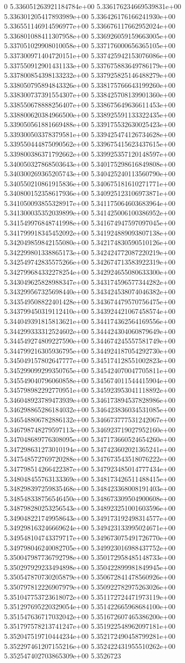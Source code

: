 0	5.336051263921184784e+00	5.336176234669539831e+00	5.336301205417893989e+00	5.336426176166241930e+00	5.336551146914596977e+00	5.336676117662952024e+00	5.336801088411307958e+00	5.336926059159663005e+00	5.337051029908010058e+00	5.337176000656365105e+00	5.337300971404720151e+00	5.337425942153076086e+00	5.337550912901431133e+00	5.337675883649786179e+00	5.337800854398133232e+00	5.337925825146488279e+00	5.338050795894843326e+00	5.338175766643199260e+00	5.338300737391554307e+00	5.338425708139901360e+00	5.338550678888256407e+00	5.338675649636611453e+00	5.338800620384966500e+00	5.338925591133322435e+00	5.339050561881669488e+00	5.339175532630025423e+00	5.339300503378379581e+00	5.339425474126734628e+00	5.339550444875090562e+00	5.339675415623437615e+00	5.339800386371792662e+00	5.339925357120148597e+00	5.340050327868503643e+00	5.340175298616849808e+00	5.340300269365205743e+00	5.340425240113560790e+00	5.340550210861915836e+00	5.340675181610271771e+00	5.340800152358617936e+00	5.340925123106973871e+00	5.341050093855328917e+00	5.341175064603683964e+00	5.341300035352039899e+00	5.341425006100386952e+00	5.341549976848741998e+00	5.341674947597097045e+00	5.341799918345452092e+00	5.341924889093807138e+00	5.342049859842155080e+00	5.342174830590510126e+00	5.342299801338865173e+00	5.342424772087220219e+00	5.342549742835575266e+00	5.342674713583922319e+00	5.342799684332278254e+00	5.342924655080633300e+00	5.343049625828988347e+00	5.343174596577344282e+00	5.343299567325698440e+00	5.343424538074046382e+00	5.343549508822401428e+00	5.343674479570756475e+00	5.343799450319112410e+00	5.343924421067458574e+00	5.344049391815813621e+00	5.344174362564169556e+00	5.344299333312524602e+00	5.344424304060879649e+00	5.344549274809227590e+00	5.344674245557581749e+00	5.344799216305936795e+00	5.344924187054292730e+00	5.345049157802647777e+00	5.345174128551002823e+00	5.345299099299350765e+00	5.345424070047705811e+00	5.345549040796060858e+00	5.345674011544415904e+00	5.345798982292770951e+00	5.345923953041118892e+00	5.346048923789473939e+00	5.346173894537828986e+00	5.346298865286184032e+00	5.346423836034531085e+00	5.346548806782886132e+00	5.346673777531242067e+00	5.346798748279597113e+00	5.346923719027952160e+00	5.347048689776308095e+00	5.347173660524654260e+00	5.347298631273010194e+00	5.347423602021365241e+00	5.347548572769720288e+00	5.347673543518076222e+00	5.347798514266422387e+00	5.347923485014777434e+00	5.348048455763133369e+00	5.348173426511488415e+00	5.348298397259835468e+00	5.348423368008191403e+00	5.348548338756546450e+00	5.348673309504900608e+00	5.348798280253256543e+00	5.348923251001603596e+00	5.349048221749958643e+00	5.349173192498314577e+00	5.349298163246669624e+00	5.349423133995024671e+00	5.349548104743379717e+00	5.349673075491726770e+00	5.349798046240082705e+00	5.349923016988437752e+00	5.350047987736792798e+00	5.350172958485148733e+00	5.350297929233494898e+00	5.350422899981849945e+00	5.350547870730205879e+00	5.350672841478560926e+00	5.350797812226907979e+00	5.350922782975263026e+00	5.351047753723618072e+00	5.351172724471973119e+00	5.351297695220329054e+00	5.351422665968684100e+00	5.351547636717032042e+00	5.351672607465386200e+00	5.351797578213741247e+00	5.351922548962097181e+00	5.352047519710444234e+00	5.352172490458799281e+00	5.352297461207155216e+00	5.352422431955510262e+00	5.352547402703865309e+00	5.3526723
